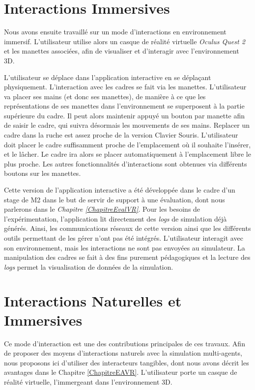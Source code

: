 		
		
	\section{Interactions Immersives}
	\label{immersionSansTangibles}
		Nous avons ensuite travaillé sur un mode d'interactions en environnement immersif. L'utilisateur utilise alors un casque de réalité virtuelle \textit{Oculus Quest 2} et les manettes associées, afin de visualiser et d'interagir avec l'environnement 3D.
		
		 L'utilisateur se déplace dans l'application interactive en se déplaçant physiquement. L'interaction avec les cadres se fait via les manettes. L'utilisateur va placer ses mains (et donc ses manettes), de manière à ce que les représentations de ses manettes dans l'environnement se superposent à la partie supérieure du cadre. Il peut alors maintenir appuyé un bouton par manette afin de saisir le cadre, qui suivra désormais les mouvements de ses mains. Replacer un cadre dans la ruche est assez proche de la version Clavier Souris. L'utilisateur doit placer le cadre suffisamment proche de l'emplacement où il souhaite l'insérer, et le lâcher. Le cadre ira alors se placer automatiquement à l'emplacement libre le plus proche. Les autres fonctionnalités d'interactions sont obtenues via différents boutons sur les manettes.
		
		Cette version de l'application interactive a été développée dans le cadre d'un stage de M2 dans le but de servir de support à une évaluation, dont nous parlerons dans le \textit{Chapitre \ref{ChapitreEvalVR}}. Pour les besoins de l'expérimentation, l'application lit directement des \textit{logs} de simulation déjà générés. Ainsi, les communications réseaux de cette version ainsi que les différents outils permettant de les gérer n'ont pas été intégrés. L'utilisateur interagit avec son environnement, mais les interactions ne sont pas envoyées au simulateur. La manipulation des cadres se fait à des fins purement pédagogiques et la lecture des \textit{logs} permet la visualisation de données de la simulation. 
		
		
	\section{Interactions Naturelles et Immersives}
	\label{InterTangible}
	
	Ce mode d'interaction est une des contributions principales de ces travaux. Afin de proposer des moyens d'interactions naturels avec la simulation multi-agents, nous proposons ici d'utiliser des interacteurs tangibles, dont nous avons décrit les avantages dans le Chapitre \ref{ChapitreEAVR}. L'utilisateur porte un casque de réalité virtuelle, l'immergeant dans l'environnement 3D.

